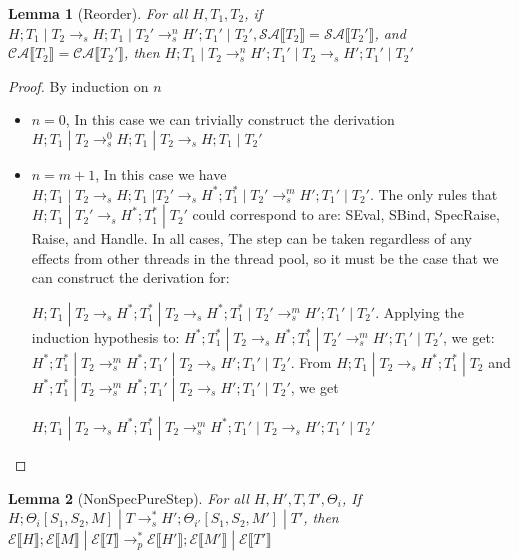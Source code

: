 \documentclass[9pt]{article}
\newtheorem{lemma}{Lemma}
\newcommand\specStep{\rightarrow_{s}}
\newcommand\parStep{\rightarrow_{p}}
\newcommand{\erase}[1]{\mathcal{E}\llbracket #1 \rrbracket}
\newcommand{\specActions}[1]{\mathcal{SA} \llbracket #1 \rrbracket}
\newcommand{\commitActions}[1]{\mathcal{CA} \llbracket #1 \rrbracket}
\begin{document}
\begin{lemma}[Reorder]
\label{reorderLemma}
For all $H, T_1, T_2$, if $H; T_1 \; | \; T_2 \specStep H; T_1 \; | \; T_2' \specStep^n H'; T_1' \; | \; T_2', \specActions{T_2} = \specActions{T_2'}$, and $\commitActions{T_2} = \commitActions{T_2'}$, then $H; T_1 \; | \; T_2 \specStep^n H'; T_1' \; | \; T_2 \specStep H'; T_1' \; | \; T_2'$

\end{lemma}

\begin{proof}

By induction on $n$

\begin{itemize}
\item $n = 0$, In this case we can trivially construct the derivation $H; T_1 \; | \; T_2 \specStep^0 H; T_1 \; | \; T_2 \specStep H; T_1 \; | \; T_2'$

\item $n = m+1$, In this case we have $H; T_1 \; | \; T_2 \specStep H; T_1 \; | T_2' \specStep H^*; T_1^* \; | \; T_2' \specStep^m H'; T_1' \; | \; T_2'$.  The only rules that $H; T_1 \; | \; T_2' \specStep H^*; T_1^* \; | \; T_2'$ could correspond to are: SEval, SBind, SpecRaise, Raise, and Handle.  In all cases, The step can be taken regardless of any effects from other threads in the thread pool, so it must be the case that we can construct the derivation for:

$H; T_1 \; | \; T_2 \specStep H^*; T_1^* \; | \; T_2 \specStep H^*; T_1^* \; | \; T_2' \specStep^m H'; T_1' \; | \; T_2'$.  Applying the induction hypothesis to: $H^*; T_1^* \; | \; T_2 \specStep H^*; T_1^* \; | \; T_2' \specStep^m H'; T_1' \; | \; T_2'$, we get: $H^*; T_1^* \; | \; T_2 \specStep^m H^*; T_1' \; | \; T_2 \specStep H'; T_1' \; | \; T_2'$.  From 
$H; T_1 \; | \; T_2 \specStep H^*; T_1^* \; | \; T_2$ and $H^*; T_1^* \; | \; T_2 \specStep^m H^*; T_1' \; | \; T_2 \specStep H'; T_1' \; | \; T_2'$, we get

$H; T_1\; | \; T_2 \specStep H^*; T_1^* \; | \; T_2 \specStep^m H^*; T_1' \; | \; T_2 \specStep H'; T_1' \; | \; T_2'$
\end{itemize}

\end{proof}

\begin{lemma}[NonSpecPureStep]
\label{nonSpecPureStep}
For all $H, H', T, T', \Theta_i$, If $H; \Theta_i[S_1, S_2, M] \; | \; T \specStep^* H'; \Theta_{i'}[S_1, S_2, M']\; | \; T'$, then $\erase{H}; \erase{M} \; | \; \erase{T} \parStep^* \erase{H'}; \erase{M'} \; | \; \erase{T'}$
\end{lemma}
\end{document}
